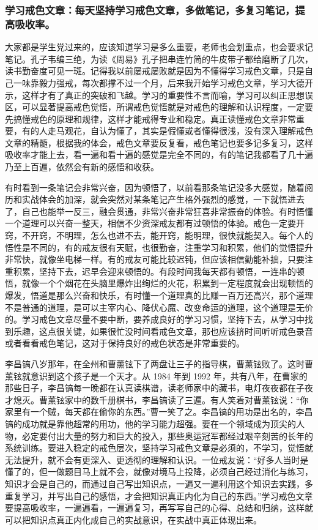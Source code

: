 \subsubsection{学习戒色文章：每天坚持学习戒色文章，多做笔记，多复习笔记，提高吸收率。}

大家都是学生党过来的，应该知道学习是多么重要，老师也会划重点，也会要求记笔记。孔子韦编三绝，为读《周易》孔子把串连竹简的牛皮带子都给磨断了几次，读书勤奋度可见一斑。记得我以前屡戒屡败就是因为不懂得学习戒色文章，只是自己一味靠毅力强戒，每次都撑不过一个月，后来我开始学习戒色文章，学习大德开示，这样才有了真正的突破和飞越。学习的重要性不言而喻，学习可以纠正思想误区，可以显著提高戒色觉悟，所谓戒色觉悟就是对戒色的理解和认识程度，一定要先搞懂戒色的原理和规律，这样才能戒得专业和稳定。真正读懂戒色文章非常重要，有的人走马观花，自认为懂了，其实是假懂或者懂得很浅，没有深入理解戒色文章的精髓，根据我的体会，戒色文章要反复看，戒色笔记也要多记多复习，这样吸收率才能上去，看一遍和看十遍的感觉是完全不同的，有的笔记我都看了几十遍乃至上百遍，依然会有新的感悟和收获。

有时看到一条笔记会非常兴奋，因为顿悟了，以前看那条笔记没多大感觉，随着阅历和实战体会的加深，就会突然对某条笔记产生格外强烈的感觉，一下就悟进去了，自己也能举一反三，融会贯通，非常兴奋非常狂喜非常振奋的体验。有时悟懂一个道理可以兴奋一整天，相信不少资深戒友都有过顿悟的体验。戒色一定要开窍，不开窍，不明理，怎么也进不去，能开窍，能明理，很快就能契入。每个人的悟性是不同的，有的戒友很有天赋，也很勤奋，注重学习和积累，他们的觉悟提升非常快，就像坐电梯一样。有的戒友可能比较迟钝，但应该相信勤能补拙，只要注重积累，坚持下去，迟早会迎来顿悟的。有段时间我每天都有顿悟，一连串的顿悟，就像一个个烟花在头脑里爆炸出绚烂的火花，积累到一定程度就会出现顿悟的爆发，悟道是那么兴奋和快乐，有时懂一个道理真的比赚一百万还高兴，那个道理不是普通的道理，是可以主宰内心、降伏心魔、改变命运的道理，这个道理是无价的。学习戒色文章尽量不要中断，要养成良好的学习习惯，坚持下去，从学习中找到乐趣，这点很关键，如果很忙没时间看戒色文章，那也应该挤时间听听戒色录音或者看看戒色笔记，这对于保持良好的戒色状态是非常重要的。

李昌镐八岁那年，在全州和曹薰铉下了两盘让三子的指导棋，曹薰铉败了。这时曹薰铉就意识到这个孩子是一个天才。从 1984 年到 1992 年，共有八年，在曹家的那些日子，李昌镐每一晚都在认真读棋谱，读老师家中的藏书，电灯夜夜都在子夜才熄灭。曹薰铉家中的数千册棋书，李昌镐读了三遍。有人笑着对曹薰铉说：“你家里有一个贼，每天都在偷你的东西。”曹一笑了之。李昌镐的用功是出名的，李昌镐的成功就是靠他超常的用功，他的学习能力超强。要在一个领域成为顶尖的人物，必定要付出大量的努力和巨大的投入，那些奥运冠军都经过艰辛刻苦的长年的系统训练。要进入稳定的戒色层次，坚持学习戒色文章是必须的，不学习，觉悟就无法提升，就不会有更深入、更透彻的理解和认识。一位戒友说：“好多人当时是懂了的，但一做题目马上就不会，就像对境马上投降，必须自己经过消化与练习，知识才会是自己的，而通过自己写出知识点，一遍又一遍利用这个知识去实践，多重复学习，并写出自己的感悟，才会把知识真正内化为自己的东西。”学习戒色文章要提高吸收率，一遍遍看，一遍遍复习，再写写自己的心得、总结和归纳，这样就可以把知识点真正内化成自己的实战意识，在实战中真正体现出来。


